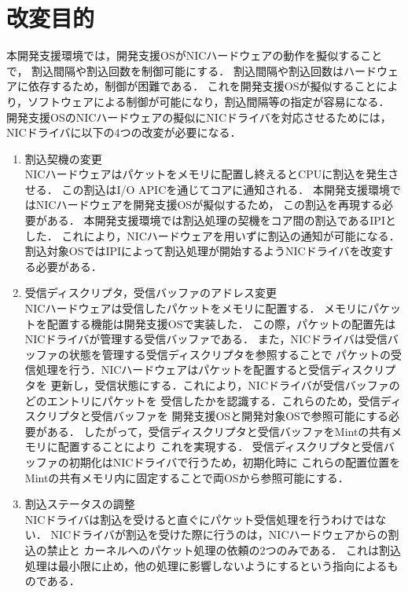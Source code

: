 \documentclass[12pt]{jsarticle}
\begin{document}
\section{改変目的}
本開発支援環境では，開発支援OSがNICハードウェアの動作を擬似することで，
割込間隔や割込回数を制御可能にする．
割込間隔や割込回数はハードウェアに依存するため，制御が困難である．
これを開発支援OSが擬似することにより，ソフトウェアによる制御が可能になり，割込間隔等の指定が容易になる．
開発支援OSのNICハードウェアの擬似にNICドライバを対応させるためには，NICドライバに以下の4つの改変が必要になる．
\begin{enumerate}
    \item 割込契機の変更\\
        NICハードウェアはパケットをメモリに配置し終えるとCPUに割込を発生させる．
        この割込はI/O APICを通じてコアに通知される．
        本開発支援環境ではNICハードウェアを開発支援OSが擬似するため，
        この割込を再現する必要がある．
        本開発支援環境では割込処理の契機をコア間の割込であるIPIとした．
        これにより，NICハードウェアを用いずに割込の通知が可能になる．
        割込対象OSではIPIによって割込処理が開始するようNICドライバを改変する必要がある．
    \item 受信ディスクリプタ，受信バッファのアドレス変更\\
        NICハードウェアは受信したパケットをメモリに配置する．
        メモリにパケットを配置する機能は開発支援OSで実装した．
        この際，パケットの配置先はNICドライバが管理する受信バッファである．
        また，NICドライバは受信バッファの状態を管理する受信ディスクリプタを参照することで
        パケットの受信処理を行う．NICハードウェアはパケットを配置すると受信ディスクリプタを
        更新し，受信状態にする．これにより，NICドライバが受信バッファのどのエントリにパケットを
        受信したかを認識する．これらのため，受信ディスクリプタと受信バッファを
        開発支援OSと開発対象OSで参照可能にする必要がある．
        したがって，受信ディスクリプタと受信バッファをMintの共有メモリに配置することにより
        これを実現する．
        受信ディスクリプタと受信バッファの初期化はNICドライバで行うため，初期化時に
        これらの配置位置をMintの共有メモリ内に固定することで両OSから参照可能にする．
    \item 割込ステータスの調整\\
        NICドライバは割込を受けると直ぐにパケット受信処理を行うわけではない．
        NICドライバが割込を受けた際に行うのは，NICハードウェアからの割込の禁止と
        カーネルへのパケット処理の依頼の2つのみである．
        これは割込処理は最小限に止め，他の処理に影響しないようにするという指向によるものである．

\end{enumerate}
\end{document}
